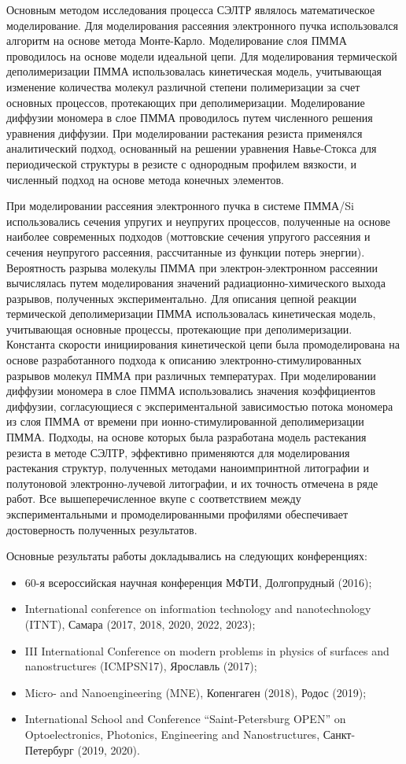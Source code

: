 \methods
Основным методом исследования процесса СЭЛТР являлось математическое моделирование. Для моделирования рассеяния электронного пучка использовался алгоритм на основе метода Монте-Карло. Моделирование слоя ПММА проводилось на основе модели идеальной цепи. Для моделирования термической деполимеризации ПММА использовалась кинетическая модель, учитывающая изменение количества молекул различной степени полимеризации за счет основных процессов, протекающих при деполимеризации. Моделирование диффузии мономера в слое ПММА проводилось путем численного решения уравнения диффузии. При моделировании растекания резиста применялся аналитический подход, основанный на решении уравнения Навье-Стокса для периодической структуры в резисте с однородным профилем вязкости, и численный подход на основе метода конечных элементов.


\probation
При моделировании рассеяния электронного пучка в системе ПММА/Si использовались сечения упругих и неупругих процессов, полученные на основе наиболее современных подходов (моттовские сечения упругого рассеяния и сечения неупругого рассеяния, рассчитанные из функции потерь энергии). Вероятность разрыва молекулы ПММА при электрон-электронном рассеянии вычислялась путем моделирования значений радиационно-химического выхода разрывов, полученных экспериментально. Для описания цепной реакции термической деполимеризации ПММА использовалась кинетическая модель, учитывающая основные процессы, протекающие при деполимеризации. Константа скорости инициирования кинетической цепи была промоделирована на основе разработанного подхода к описанию электронно-стимулированных разрывов молекул ПММА при различных температурах. При моделировании диффузии мономера в слое ПММА использовались значения коэффициентов диффузии, согласующиеся с экспериментальной зависимостью потока мономера из слоя ПММА от времени при ионно-стимулированной деполимеризации ПММА. Подходы, на основе которых была разработана модель растекания резиста в методе СЭЛТР, эффективно применяются для моделирования растекания структур, полученных методами наноимпринтной литографии и полутоновой электронно-лучевой литографии, и их точность отмечена в ряде работ. Все вышеперечисленное вкупе с соответствием между экспериментальными и промоделированными профилями обеспечивает достоверность полученных результатов.

Основные результаты работы докладывались на следующих конференциях:
\begin{itemize}
	\item 60-я всероссийская научная конференция МФТИ, Долгопрудный (2016);
	\item International conference on information technology and nanotechnology (ITNT), Самара (2017, 2018, 2020, 2022, 2023);
	\item III International Conference on modern problems in physics of surfaces and nanostructures (ICMPSN17), Ярославль (2017);
	\item Micro- and Nanoengineering (MNE), Копенгаген (2018), Родос (2019);
	\item International School and Conference ``Saint-Petersburg OPEN'' on Optoelectronics, Photonics, Engineering and Nanostructures, Санкт-Петербург (2019, 2020).	
\end{itemize}

